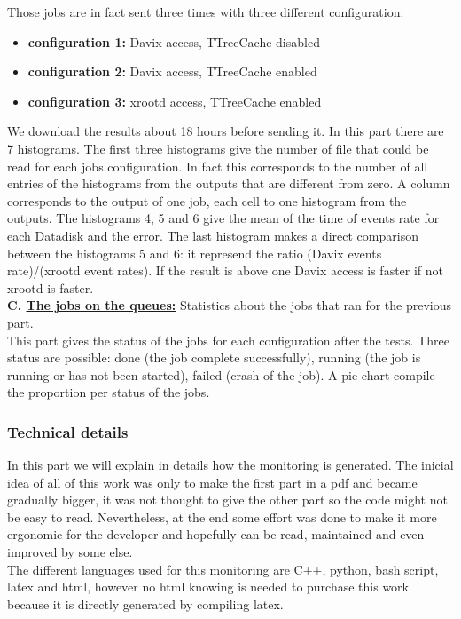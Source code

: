 Those jobs are in fact sent three times with three different configuration:
	\begin{itemize}
		\item \textbf{configuration 1:} Davix access, TTreeCache disabled
		\item \textbf{configuration 2:} Davix access, TTreeCache enabled
		\item \textbf{configuration 3:} xrootd access, TTreeCache enabled
	\end{itemize}

We download the results about 18 hours before sending it. In this part there are 7 histograms. The first three histograms give the number of file that could be read for each jobs configuration. In fact this corresponds to the number of all entries of the histograms from the outputs that are different from zero. A column corresponds to the output of one job, each cell to one histogram from the outputs. The histograms 4, 5 and 6 give the mean of the time of events rate for each Datadisk and the error.
The last histogram makes a direct comparison between the histograms 5 and 6: it represend the ratio (Davix events rate)/(xrootd event rates). If the result is above one Davix access is faster if not xrootd is faster.\\

\indent	\textbf{C. \underline{The jobs on the queues:}} Statistics about the jobs that ran for the previous part.\\
This part gives the status of the jobs for each configuration after the tests. Three status are possible: done (the job complete successfully), running (the job is running or has not been started), failed (crash of the job). A pie chart compile the proportion per status of the jobs.

\subsubsection{Technical details}

In this part we will explain in details how the monitoring is generated. The inicial idea of all of this work was only to make the first part in a pdf and became gradually bigger, it was not thought to give the other part so the code might not be easy to read. Nevertheless, at the end some effort was done to make it more ergonomic for the developer and hopefully can be read, maintained and even improved by some else. \\

The different languages used for this monitoring are C++, python, bash script, latex and html, however no html knowing is needed to purchase this work because it is directly generated by compiling latex. \\

